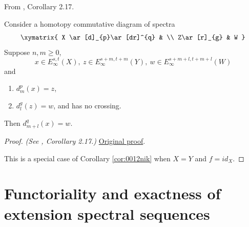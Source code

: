 \begin{corollary}
\label{paper:2.17}
From \cite{LWX126}, Corollary 2.17.\par
\label{cor:290d35ce}
    Consider a homotopy commutative diagram of spectra
    $$\xymatrix{
    X \ar[d]_{p}\ar[dr]^{q} & \\
    Z\ar[r]_{g} & W
    }$$
    Suppose $n,m\ge 0$, 
    $$x\in E^{s,t}_\infty(X), ~z\in E^{s+m,t+m}_\infty(Y), ~w\in E^{s+m+l,t+m+l}_\infty(W)$$
    and
    \begin{enumerate}
        \item $d^{p}_{m}(x)=z$,
        \item $d^{g}_{l}(z)=w$, and has no crossing.
    \end{enumerate}
    Then $d^{q}_{m+l}(x)=w$.

\end{corollary}
\begin{proof}
\textit{(See \cite{LWX126}, Corollary 2.17.)} \href{paper/main.tex.html#L613}{Original proof}.

This is a special case of Corollary \ref{cor:0012nik} when $X=Y$ and $f=id_X$.
\end{proof}

\section{Functoriality and exactness of extension spectral sequences}

